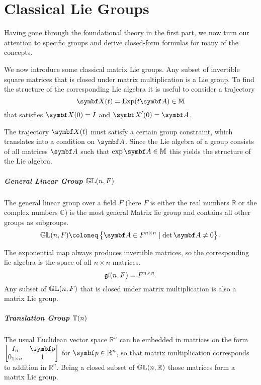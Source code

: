 \chapter{Classical Lie Groups}

Having gone through the foundational theory in the first part, we now turn our attention to specific groups and derive closed-form formulas for many of the concepts.

We now introduce some classical matrix Lie groups. Any subset of invertible square matrices that is closed under matrix multiplication is a Lie group. To find the structure of the corresponding Lie algebra it is useful to consider a trajectory
\begin{equation}
  \label{eq:4}
  \X(t) = \Exp(t \A) \in \M
\end{equation}
that satisfies $\X(0) = I$ and $\X'(0) = \A$.

The trajectory $\X(t)$ must satisfy a certain group constraint, which translates into a condition on $\A$. Since the Lie algebra of a group consists of all matrices $\A$ such that $\exp \A \in \M$ this yields the structure of the Lie algebra.

\paragraph{General Linear Group ${\mathbb{GL}}(n, F)$}

The general linear group over a field $F$ (here $F$ is either the real numbers $\mathbb{R}$ or the complex numbers $\mathbb{C}$) is the most general Matrix lie group and contains all other groups as subgroups.
\begin{equation}
  \GL(n, F) \coloneq \left\{ \A \in F^{{n \times n}} \mid \det \A \neq 0 \right\}.
\end{equation}

The exponential map always produces invertible matrices, so the corresponding lie algebra is the space of all $n \times n$ matrices.
\begin{equation}
  \mathfrak{gl}(n, F) = F^{n \times n}.
\end{equation}
Any subset of ${\mathbb{GL}}(n, F)$ that is closed under matrix multiplication is also a matrix Lie group.

\paragraph{Translation Group ${\mathbb{T}(n)}$}

The usual Euclidean vector space $\mathbb{R}^{n}$ can be embedded in matrices on the form $\begin{bmatrix} I_{n} & \bp \\ 0_{1 \times n} & 1 \end{bmatrix}$ for $\bp \in \mathbb{R}^{n}$, so that matrix multiplication corresponds to addition in $\mathbb{R}^{n}$. Being a closed subset of ${\mathbb{GL}}(n, \mathbb{R})$ those matrices form a matrix Lie group.

